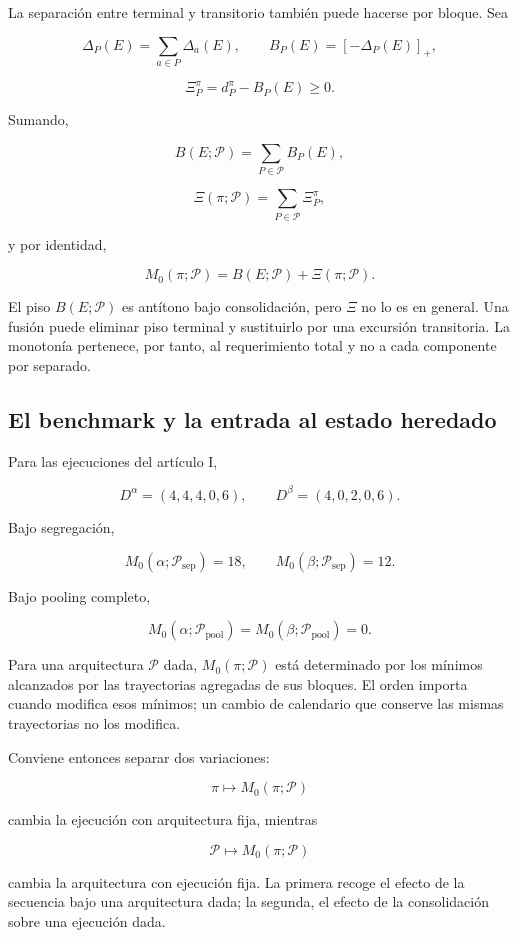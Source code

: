\documentclass[10pt,a5paper,twoside]{article}
\begin{document}
La separación entre terminal y transitorio también puede hacerse por
bloque. Sea

\[
\Delta_P(E)=\sum_{a\in P}\Delta_a(E),
\qquad
B_P(E)=[-\Delta_P(E)]_+,
\]

\[
\Xi^\pi_P=d^\pi_P-B_P(E)\ge0.
\]

Sumando,

\[
B(E;\mathcal P)
=
\sum_{P\in\mathcal P}B_P(E),
\]

\[
\Xi(\pi;\mathcal P)
=
\sum_{P\in\mathcal P}\Xi^\pi_P,
\]

y por identidad,

\[
M_0(\pi;\mathcal P)
=
B(E;\mathcal P)+\Xi(\pi;\mathcal P).
\]

El piso \(B(E;\mathcal P)\) es antítono bajo consolidación, pero \(\Xi\)
no lo es en general. Una fusión puede eliminar piso terminal y
sustituirlo por una excursión transitoria. La monotonía pertenece, por tanto, al requerimiento total y no a cada
componente por separado.

\subsection{El benchmark y la entrada al estado heredado}\label{el-benchmark-y-la-entrada-al-estado-heredado}

Para las ejecuciones del artículo I,

\[
D^\alpha=(4,4,4,0,6),
\qquad
D^\beta=(4,0,2,0,6).
\]

Bajo segregación,

\[
M_0(\alpha;\mathcal P_{\mathrm{sep}})=18,
\qquad
M_0(\beta;\mathcal P_{\mathrm{sep}})=12.
\]

Bajo pooling completo,

\[
M_0(\alpha;\mathcal P_{\mathrm{pool}})
=
M_0(\beta;\mathcal P_{\mathrm{pool}})
=
0.
\]

Para una arquitectura \(\mathcal P\) dada, \(M_0(\pi;\mathcal P)\) está
determinado por los mínimos alcanzados por las trayectorias agregadas de
sus bloques. El orden importa cuando modifica esos mínimos; un cambio de
calendario que conserve las mismas trayectorias no los modifica.

Conviene entonces separar dos variaciones:

\[
\pi\mapsto M_0(\pi;\mathcal P)
\]

cambia la ejecución con arquitectura fija, mientras

\[
\mathcal P\mapsto M_0(\pi;\mathcal P)
\]

cambia la arquitectura con ejecución fija. La primera recoge el efecto de la secuencia bajo una arquitectura dada;
la segunda, el efecto de la consolidación sobre una ejecución dada.
\end{document}
